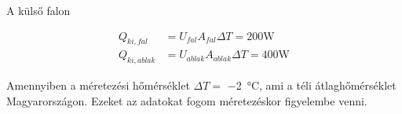 A külső falon

\begin{equation}\label{eq_hoigeny}
\begin{aligned}
		Q_{ki,fal} &= U_{fal}A_{fal}\Delta T = 200\si{\watt}\\[10pt]
		Q_{ki,ablak} &= U_{ablak}A_{ablak}\Delta T = 400\si{\watt}
\end{aligned}
\end{equation}

Amennyiben a méretezési hőmérséklet $\Delta T=$ \SI{-2}{\celsius}, ami a téli átlaghőmérséklet Magyarországon. Ezeket az adatokat fogom méretezéskor figyelembe venni.








%
%
%

